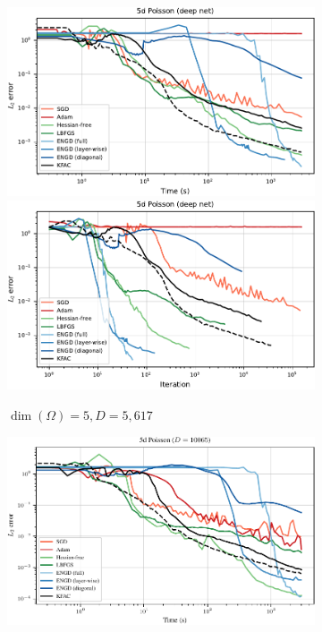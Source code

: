 \begin{figure}[!h]
  \hfill
  \begin{subfigure}{0.325\linewidth}
    \includegraphics[width=\linewidth]{../kfac_pinns_exp/exp12_poisson5d_deep/l2_error_over_time}
    \\
    \includegraphics[width=\linewidth]{../kfac_pinns_exp/exp12_poisson5d_deep/l2_error_over_step}
    \caption{$\dim(\Omega) = 5, D = 5,617$}
  \end{subfigure}
  \hfill
  \begin{subfigure}{0.325\linewidth}
    \includegraphics[width=\linewidth]{../kfac_pinns_exp/exp16_poisson5d_deepwide/l2_error_over_time}

\end{subfigure}
\end{figure}
